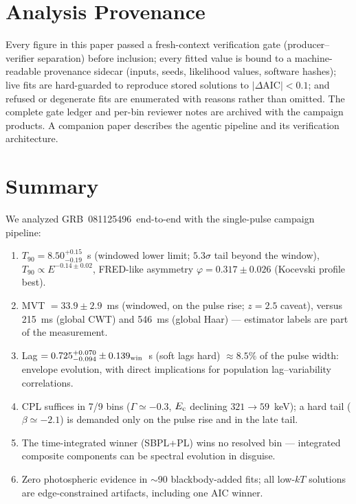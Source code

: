 \documentclass[twocolumn]{aastex631}
\newcommand{\grb}{GRB~081125496}
\begin{document}
\section{Analysis Provenance} \label{sec:provenance}

Every figure in this paper passed a fresh-context verification gate
(producer--verifier separation) before inclusion; every fitted value is bound
to a machine-readable provenance sidecar (inputs, seeds, likelihood values,
software hashes); live fits are hard-guarded to reproduce stored solutions to
$|\Delta\mathrm{AIC}| < 0.1$; and refused or degenerate fits are enumerated
with reasons rather than omitted. The complete gate ledger and per-bin
reviewer notes are archived with the campaign products. A companion paper
describes the agentic pipeline and its verification architecture.

\section{Summary} \label{sec:summary}

We analyzed \grb\ end-to-end with the single-pulse campaign pipeline:
\begin{enumerate}
\item $T_{90} = 8.50^{+0.15}_{-0.19}$~s (windowed lower limit;
$5.3\sigma$ tail beyond the window), $T_{90} \propto E^{-0.14\pm0.02}$,
FRED-like asymmetry $\varphi = 0.317 \pm 0.026$ (Kocevski profile best).
\item MVT $= 33.9 \pm 2.9$~ms (windowed, on the pulse rise; $z = 2.5$
caveat), versus 215~ms (global CWT) and 546~ms (global Haar) --- estimator
labels are part of the measurement.
\item Lag $= 0.725^{+0.070}_{-0.094} \pm 0.139_{\rm win}$~s (soft lags hard) $\approx 8.5\%$ of the
pulse width: envelope evolution, with direct implications for population
lag--variability correlations.
\item CPL suffices in 7/9 bins ($\Gamma \simeq -0.3$, $E_{\rm c}$ declining
$321 \rightarrow 59$~keV); a hard tail ($\beta \simeq -2.1$) is demanded only
on the pulse rise and in the late tail.
\item The time-integrated winner (SBPL+PL) wins no resolved bin ---
integrated composite components can be spectral evolution in disguise.
\item Zero photospheric evidence in $\sim$90 blackbody-added fits; all
low-$kT$ solutions are edge-constrained artifacts, including one AIC winner.
\end{enumerate}
\end{document}
